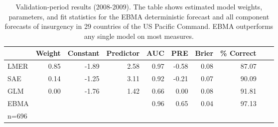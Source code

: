 \begin{table}[p]
\small
\begin{center}
  \caption{\footnotesize Validation-period results (2008-2009).  The
    table shows estimated model weights, parameters, and fit
    statistics for the EBMA deterministic forecast and all component
    forecasts of insurgency in 29 countries of the US Pacific Command.  EBMA
    outperforms any single model on most measures.}\label{InSam1}
\begin{tabular}{lrrrrrrrrr}
  \toprule
 & Weight & Constant & Predictor & AUC & PRE & Brier & \% Correct \\ 
  \midrule
LMER & 0.85 & -1.89 & 2.58 & 0.97 & -0.58 & 0.08 & 87.07 \\
   SAE & 0.14 & -1.25 & 3.11 & 0.92 & -0.21 & 0.07 & 90.09\\
 GLM & 0.00 & -1.76 & 1.42 & 0.66 & 0.00 & 0.08 & 91.81 \\
  EBMA &  &  &  & 0.96 & 0.65 & 0.04 & 97.13 \\   
\bottomrule
n=696\\
\end{tabular}
\end{center}
\end{table}


